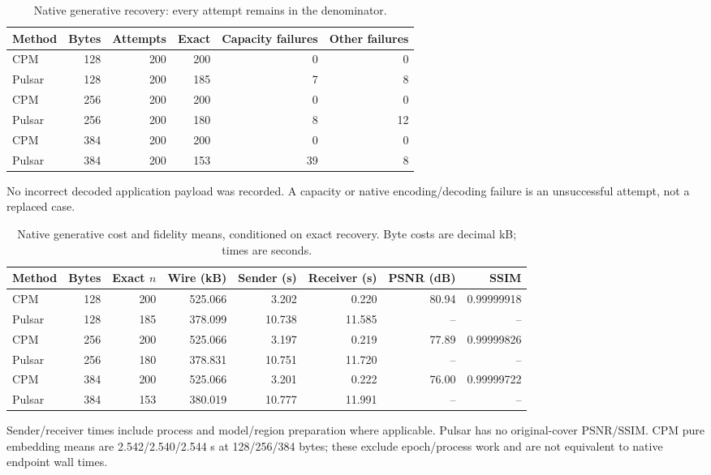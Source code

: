 \documentclass[journal]{IEEEtran}
\renewcommand{\arraystretch}{1.2}
\renewcommand{\arraystretch}{1.0}
\theoremstyle{definition}
\theoremstyle{game}
\renewcommand{\arraystretch}{1.5}
\begin{document}
\begin{table}[!t]
\centering\small
\caption{Native generative recovery: every attempt remains in the denominator.}
\label{tab:native-recovery}
\setlength{\tabcolsep}{4pt}\renewcommand{\arraystretch}{1.12}
\begin{tabular}{lrrrrr}
\toprule
Method & Bytes & Attempts & Exact & Capacity failures & Other failures\\
\midrule
CPM & 128 & 200 & 200 & 0 & 0\\
Pulsar & 128 & 200 & 185 & 7 & 8\\
CPM & 256 & 200 & 200 & 0 & 0\\
Pulsar & 256 & 200 & 180 & 8 & 12\\
CPM & 384 & 200 & 200 & 0 & 0\\
Pulsar & 384 & 200 & 153 & 39 & 8\\
\bottomrule
\end{tabular}
\par\smallskip\parbox{.97\textwidth}{\footnotesize No incorrect decoded application payload was recorded. A capacity or native encoding/decoding failure is an unsuccessful attempt, not a replaced case.}
\end{table}

\begin{table}[!t]
\centering\small
\caption{Native generative cost and fidelity means, conditioned on exact recovery. Byte costs are decimal kB; times are seconds.}
\label{tab:native-cost}
\setlength{\tabcolsep}{4pt}\renewcommand{\arraystretch}{1.12}
\begin{tabular}{lrrrrrrr}
\toprule
Method & Bytes & Exact $n$ & Wire (kB) & Sender (s) & Receiver (s) & PSNR (dB) & SSIM\\
\midrule
CPM & 128 & 200 & 525.066 & 3.202 & 0.220 & 80.94 & 0.99999918\\
Pulsar & 128 & 185 & 378.099 & 10.738 & 11.585 & -- & --\\
CPM & 256 & 200 & 525.066 & 3.197 & 0.219 & 77.89 & 0.99999826\\
Pulsar & 256 & 180 & 378.831 & 10.751 & 11.720 & -- & --\\
CPM & 384 & 200 & 525.066 & 3.201 & 0.222 & 76.00 & 0.99999722\\
Pulsar & 384 & 153 & 380.019 & 10.777 & 11.991 & -- & --\\
\bottomrule
\end{tabular}
\par\smallskip\parbox{.97\textwidth}{\footnotesize Sender/receiver times include process and model/region preparation where applicable. Pulsar has no original-cover PSNR/SSIM. CPM pure embedding means are 2.542/2.540/2.544 s at 128/256/384 bytes; these exclude epoch/process work and are not equivalent to native endpoint wall times.}
\end{table}
\end{document}
